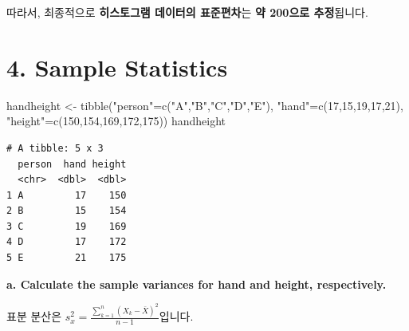 \documentclass[
  letterpaper,
  DIV=11,
  numbers=noendperiod]{scrreprt}
\newenvironment{Shaded}{\begin{snugshade}}{\end{snugshade}}
\newcommand{\DecValTok}[1]{\textcolor[rgb]{0.68,0.00,0.00}{#1}}
\newcommand{\FunctionTok}[1]{\textcolor[rgb]{0.28,0.35,0.67}{#1}}
\newcommand{\NormalTok}[1]{\textcolor[rgb]{0.00,0.23,0.31}{#1}}
\newcommand{\OtherTok}[1]{\textcolor[rgb]{0.00,0.23,0.31}{#1}}
\newcommand{\StringTok}[1]{\textcolor[rgb]{0.13,0.47,0.30}{#1}}
\begin{document}
따라서, 최종적으로 \textbf{히스토그램 데이터의 표준편차}는 \textbf{약
200으로 추정}됩니다.

\section*{4. Sample Statistics}\label{sample-statistics}


\begin{Shaded}
\begin{Highlighting}[]
\NormalTok{handheight }\OtherTok{\textless{}{-}} \FunctionTok{tibble}\NormalTok{(}\StringTok{"person"}\OtherTok{=}\FunctionTok{c}\NormalTok{(}\StringTok{"A"}\NormalTok{,}\StringTok{"B"}\NormalTok{,}\StringTok{"C"}\NormalTok{,}\StringTok{"D"}\NormalTok{,}\StringTok{"E"}\NormalTok{),}
                     \StringTok{"hand"}\OtherTok{=}\FunctionTok{c}\NormalTok{(}\DecValTok{17}\NormalTok{,}\DecValTok{15}\NormalTok{,}\DecValTok{19}\NormalTok{,}\DecValTok{17}\NormalTok{,}\DecValTok{21}\NormalTok{),}
                     \StringTok{"height"}\OtherTok{=}\FunctionTok{c}\NormalTok{(}\DecValTok{150}\NormalTok{,}\DecValTok{154}\NormalTok{,}\DecValTok{169}\NormalTok{,}\DecValTok{172}\NormalTok{,}\DecValTok{175}\NormalTok{))}
\NormalTok{handheight}
\end{Highlighting}
\end{Shaded}

\begin{verbatim}
# A tibble: 5 x 3
  person  hand height
  <chr>  <dbl>  <dbl>
1 A         17    150
2 B         15    154
3 C         19    169
4 D         17    172
5 E         21    175
\end{verbatim}

\textbf{a. Calculate the sample variances for hand and height,
respectively.}

표분 분산은 \(s_x^2=\frac{\sum_{k=1}^n(X_k-\bar{X})^2}{n-1}\)입니다.
\end{document}
